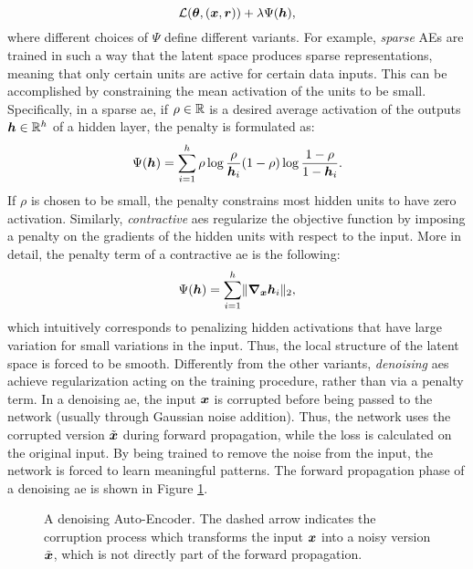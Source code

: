 $$\Loss(\Param, (\Vector{x}, \Vector{r})) + \lambda \Psi(\Vector{h}),$$
where different choices of $\Psi$ define different variants. For example, \emph{sparse} AEs
are trained in such a way that the latent space produces sparse representations, meaning that only certain units are active for certain data inputs. This can be accomplished by constraining the mean activation of the units to be small. Specifically, in a sparse \gls{ae}, if $\rho \in \mathbb{R}$ is a desired average activation of the outputs $\Vector{h} \in \Real^h$ of a hidden layer, the penalty is formulated as:
$$\Psi(\Vector{h}) = \sum_{i=1}^h \rho \log \frac{\rho}{\Vector{h}_i} (1 - \rho) \log \frac{1-\rho}{1-\Vector{h}_i}.$$
If $\rho$ is chosen to be small, the penalty constrains most hidden units to have zero activation. Similarly, \emph{contractive} \glspl{ae} \citep{rifai2011contractiveautoenc} regularize the objective function by imposing a penalty on the gradients of the hidden units with respect to the input. More in detail, the penalty term of a contractive \gls{ae} is the following:
$$\Psi(\Vector{h}) = \sum_{i=1}^h\norm{\grad_{\Vector{x}}\Vector{h}_i}_2,$$
which intuitively corresponds to penalizing hidden activations that have large variation for small variations in the input. Thus, the local structure of the latent space is forced to be smooth. Differently from the other variants, \emph{denoising} \glspl{ae} \citep{vincent2010denoisingautoenc} achieve regularization acting on the training procedure, rather than via a penalty term. In a denoising \gls{ae}, the input $\Vector{x}$ is corrupted before being passed to the network (usually through Gaussian noise addition). Thus, the network uses the corrupted version $\tilde{\Vector{x}}$ during forward propagation, while the loss is calculated on the original input. By being trained to remove the noise from the input, the network is forced to learn meaningful patterns. The forward propagation phase of a denoising \gls{ae} is shown in Figure \ref{fig:denoising-ae}.
\begin{figure*}[h!]
    \centering
    \resizebox{.6\textwidth}{!}{}
    \caption{A denoising Auto-Encoder. The dashed arrow indicates the corruption process which transforms the input $\Vector{x}$ into a noisy version $\tilde{\Vector{x}}$, which is not directly part of the forward propagation.}
    \label{fig:denoising-ae}
\end{figure*}

